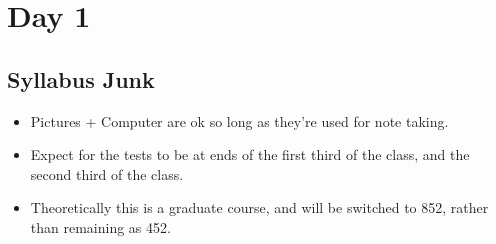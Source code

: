
\section{Day 1}
\subsection{Syllabus Junk}
    \begin{itemize}
        \item Pictures + Computer are ok so long as they're used for note taking.
        \item Expect for the tests to be at ends of the first third of the class, and the second third of the class.
        \item Theoretically this is a graduate course, and will be switched to 852, rather than remaining as 452.
    \end{itemize}
